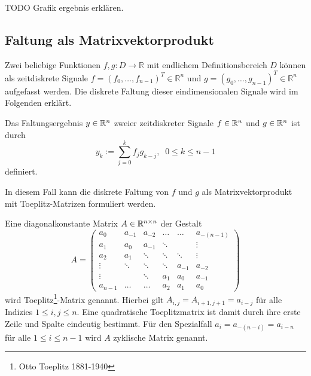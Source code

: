 TODO Grafik ergebnis erklären.

\subsection{Faltung als Matrixvektorprodukt}
\label{abs:conv_using_sparse}
Zwei beliebige Funktionen $f,g: D \rightarrow \mathbb{R}$ mit endlichem Definitionsbereich $D$ können als zeitdiskrete Signale $f=(f_0, \ldots, f_{n-1})^T \in \mathbb{R}^{n}$ und $g=(g_0, \ldots, g_{n-1})^T \in \mathbb{R}^{n}$ aufgefasst werden. %
Die diskrete Faltung dieser eindimensionalen Signale wird im Folgenden erklärt.

\begin{defi}
    \label{def:cycconv}
    Das Faltungsergebnis $y \in \mathbb{R}^{n}$ zweier zeitdiskreter Signale $f \in \mathbb{R}^n$ und $g \in \mathbb{R}^n$ ist durch
    \begin{equation}
        y_k:=\sum_{j=0}^{k} f_j g_{k-j}, \; \; 0 \leq k \leq n-1
    \end{equation}
    definiert.
\end{defi}
In diesem Fall kann die diskrete Faltung von $f$ und $g$ als Matrixvektorprodukt mit Toeplitz-Matrizen formuliert werden. 

\begin{defi}
    \label{def:toeplitzM}
    Eine diagonalkonstante Matrix $A \in \mathbb{R}^{n \times n}$ der Gestalt
    \begin{equation*}
    A=
    \begin{pmatrix}
        a_0 & a_{-1} &a_{-2} &\ldots &\ldots &a_{-(n-1)} \\ 
        a_1 & a_0 &a_{-1} &\ddots & &\vdots \\
        a_2 & a_1 &\ddots &\ddots &\ddots &\vdots\\
        \vdots & \ddots &\ddots &\ddots &a_{-1} &a_{-2}\\
        \vdots & &\ddots &a_1 &a_0 &a_{-1} \\
        a_{n-1} &\ldots &\ldots &a_{2} &a_{1} &a_0
    \end{pmatrix}
\end{equation*}
    wird Toeplitz\footnote{Otto Toeplitz 1881-1940}-Matrix genannt. Hierbei gilt $A_{i,j}=A_{i+1,j+1}=a_{i-j}$ für alle Indizies $1 \leq i, j \leq n$. Eine quadratische Toeplitzmatrix ist damit durch ihre erste Zeile und Spalte eindeutig bestimmt. Für den Spezialfall $a_i=a_{-(n-i)}=a_{i-n}$ für alle $1 \leq i \leq n-1$ wird $A$ zyklische Matrix genannt.
\end{defi}


